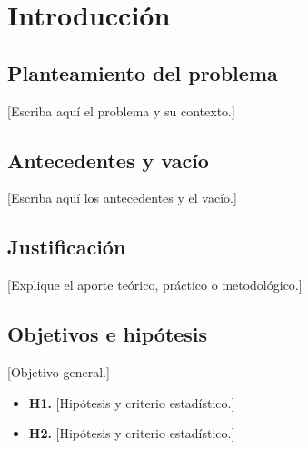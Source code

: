 \section{Introducción}

\subsection{Planteamiento del problema}
[Escriba aquí el problema y su contexto.]

\subsection{Antecedentes y vacío}
[Escriba aquí los antecedentes y el vacío.]

\subsection{Justificación}
[Explique el aporte teórico, práctico o metodológico.]

\subsection{Objetivos e hipótesis}
[Objetivo general.]
\begin{itemize}
  \item \textbf{H1.} [Hipótesis y criterio estadístico.]
  \item \textbf{H2.} [Hipótesis y criterio estadístico.]
\end{itemize}
